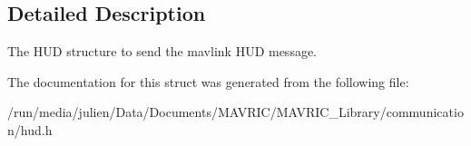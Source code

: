 \subsection{Detailed Description}
The H\+U\+D structure to send the mavlink H\+U\+D message. 

The documentation for this struct was generated from the following file\+:\begin{DoxyCompactItemize}
\item 
/run/media/julien/\+Data/\+Documents/\+M\+A\+V\+R\+I\+C/\+M\+A\+V\+R\+I\+C\+\_\+\+Library/communication/hud.\+h\end{DoxyCompactItemize}
